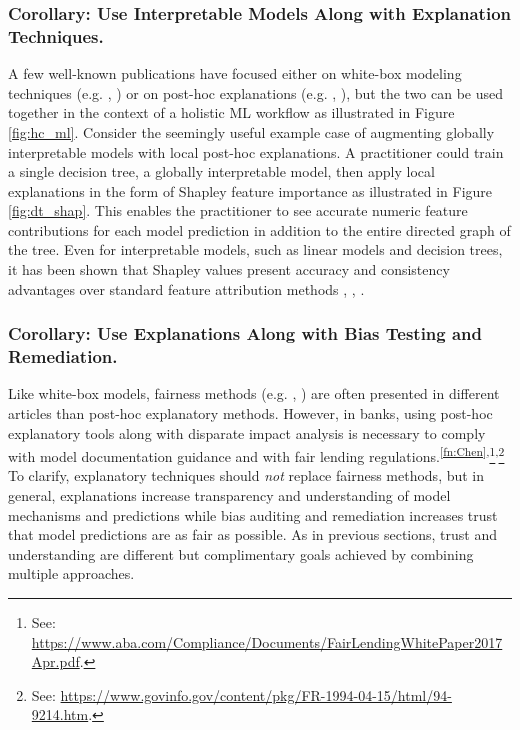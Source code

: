 \documentclass[sigconf]{acmart}
\begin{document}
\subsubsection{Corollary: Use Interpretable Models Along with Explanation Techniques.} A few well-known publications have focused either on white-box modeling techniques (e.g. \citet{slim}, \citet{sbrl}) or on post-hoc explanations (e.g. \citet{shapley}, \citet{lime}), but the two can be used together in the context of a holistic ML workflow as illustrated in Figure \ref{fig:hc_ml}. Consider the seemingly useful example case of augmenting globally interpretable models with local post-hoc explanations. A practitioner could train a single decision tree, a globally interpretable model, then apply local explanations in the form of Shapley feature importance as illustrated in Figure \ref{fig:dt_shap}. This enables the practitioner to see accurate numeric feature contributions for each model prediction in addition to the entire directed graph of the tree. Even for interpretable models, such as linear models and decision trees, it has been shown that Shapley values present accuracy and consistency advantages over standard feature attribution methods \cite{lipovetsky2001analysis}, \cite{tree_shap}, \cite{shapley}. 

\subsubsection{Corollary: Use Explanations Along with Bias Testing and Remediation.} Like white-box models, fairness methods (e.g. \citet{feldman2015certifying}, \citet{hardt2016equality}) are often presented in different articles than post-hoc explanatory methods. However, in banks, using post-hoc explanatory tools along with disparate impact analysis is necessary to comply with model documentation guidance and with fair lending regulations.\textsuperscript{\ref{fn:Chen},}\footnote{\scriptsize{See: \url{https://www.aba.com/Compliance/Documents/FairLendingWhitePaper2017Apr.pdf}.}}\textsuperscript{,}\footnote{\scriptsize{See: \url{https://www.govinfo.gov/content/pkg/FR-1994-04-15/html/94-9214.htm}.}} To clarify, explanatory techniques should \textit{not} replace fairness methods, but in general, explanations increase transparency and understanding of model mechanisms and predictions while bias auditing and remediation increases trust that model predictions are as fair as possible. As in previous sections, trust and understanding are different but complimentary goals achieved by combining multiple approaches.
\end{document}
